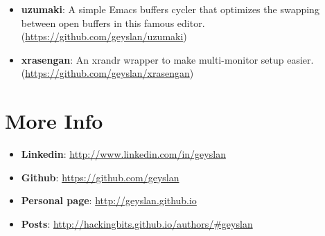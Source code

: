 \documentclass[margin]{res}
\begin{document}
\begin{resume}
\begin{itemize}
\item \textbf{uzumaki}: A simple Emacs buffers cycler that optimizes
  the swapping between open buffers in this famous editor.\newline
  (\url{https://github.com/geyslan/uzumaki})\vspace{1mm}

\item \textbf{xrasengan}: An xrandr wrapper to make multi-monitor
  setup easier.\newline
  (\url{https://github.com/geyslan/xrasengan})\vspace{1mm}
\end{itemize}

\section{More Info}
\begin{itemize}
\item \textbf{Linkedin}: \url{http://www.linkedin.com/in/geyslan}
\item \textbf{Github}: \url{https://github.com/geyslan}
\item \textbf{Personal page}: \url{http://geyslan.github.io}
\item \textbf{Posts}: \url{http://hackingbits.github.io/authors/#geyslan}
\end{itemize}

\end{resume}
\end{document}
